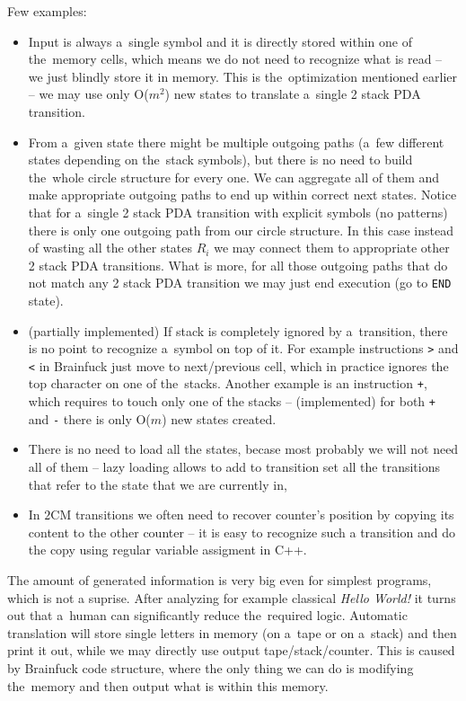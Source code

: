 \documentclass[english,shortabstract,mgr]{iithesis}
\begin{document}
Few examples:
\begin{itemize}
  \item Input is always a~single symbol and it is directly stored within one of the~memory cells,
      which means we do not need to recognize what is read -- we just blindly store it in memory.
      This is the~optimization mentioned earlier -- we may use only O($m^2$) new states to translate
      a~single 2 stack PDA transition.
  \item From a~given state there might be multiple outgoing paths (a~few different states depending
      on the~stack symbols), but there is no need to build the~whole circle structure for every one.
      We can aggregate all of them and make appropriate outgoing paths to end up within correct
      next states. Notice that for a~single 2 stack PDA transition with explicit symbols (no patterns)
      there is only one outgoing path from our circle structure. In this case instead of wasting all
      the other states $R_i$ we may connect them to appropriate other 2 stack PDA transitions.
      What is more, for all those outgoing paths that do not match any 2 stack PDA transition
      we may just end execution (go to \texttt{END} state).
  \item (partially implemented) If stack is completely ignored by a~transition, there is no point
      to recognize a~symbol on top of it. For example instructions \texttt{>} and \texttt{<}
      in Brainfuck just move to next/previous cell, which in practice ignores the top
      character on one of the~stacks. Another example is an instruction \texttt{+},
      which requires to touch only one of the stacks -- (implemented) for both
      \texttt{+} and \texttt{-} there is only O($m$) new states created.
  \item There is no need to load all the states, becase most probably we will
      not need all of them -- lazy loading allows to add to transition set
      all the transitions that refer to the state that we are currently in,
  \item In $2$CM transitions we often need to recover counter's position by
      copying its content to the other counter -- it is easy to recognize such
      a transition and do the copy using regular variable assigment in C++.
\end{itemize}

The amount of generated information is very big even for simplest programs, which is not a suprise.
After analyzing for example classical \textit{Hello World!} it turns out that a~human can
significantly reduce the~required logic. Automatic translation will store single letters
in memory (on a~tape or on a~stack) and then print it out, while we may directly use output
tape/stack/counter. This is caused by Brainfuck code structure, where the only thing we can do
is modifying the~memory and then output what is within this memory.
\end{document}
